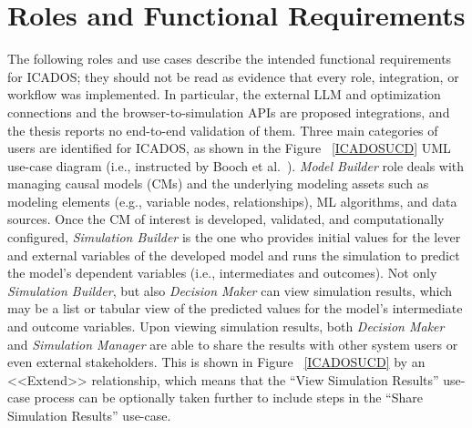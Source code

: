 \documentclass{sfuthesis}
\begin{document}
\section{Roles and Functional Requirements}
The following roles and use cases describe the intended functional requirements for ICADOS; they should not be read as evidence that every role, integration, or workflow was implemented. In particular, the external LLM and optimization connections and the browser-to-simulation APIs are proposed integrations, and the thesis reports no end-to-end validation of them.
Three main categories of users are identified for ICADOS, as shown in the Figure ~\ref{ICADOSUCD} UML use-case diagram (i.e., instructed by Booch et al.~\cite{booch1997uml}). \textit{Model Builder} role deals with managing causal models (CMs) and the underlying modeling assets such as modeling elements (e.g., variable nodes, relationships), ML algorithms, and data sources. Once the CM of interest is developed, validated, and computationally configured, \textit{Simulation Builder} is the one who provides initial values for the lever and external variables of the developed model and runs the simulation to predict the model's dependent variables (i.e., intermediates and outcomes). Not only \textit{Simulation Builder}, but also \textit{Decision Maker} can view simulation results, which may be a list or tabular view of the predicted values for the model's intermediate and outcome variables. Upon viewing simulation results, both \textit{Decision Maker} and \textit{Simulation Manager} are able to share the results with other system users or even external stakeholders. This is shown in Figure ~\ref{ICADOSUCD} by an <<Extend>> relationship, which means that the “View Simulation Results” use-case process can be optionally taken further to include steps in the “Share Simulation Results” use-case.\par
\end{document}
